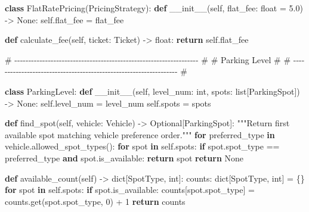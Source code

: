 \documentclass[11pt]{article}
\newenvironment{Shaded}{\begin{snugshade}}{\end{snugshade}}
\newcommand{\BuiltInTok}[1]{\textcolor[rgb]{0.50,0.55,0.55}{#1}}
\newcommand{\CommentTok}[1]{\textcolor[rgb]{0.48,0.49,0.49}{#1}}
\newcommand{\ControlFlowTok}[1]{\textcolor[rgb]{0.99,0.74,0.29}{\textbf{#1}}}
\newcommand{\DecValTok}[1]{\textcolor[rgb]{0.96,0.45,0.00}{#1}}
\newcommand{\FloatTok}[1]{\textcolor[rgb]{0.96,0.45,0.00}{#1}}
\newcommand{\FunctionTok}[1]{\textcolor[rgb]{0.56,0.27,0.68}{#1}}
\newcommand{\KeywordTok}[1]{\textcolor[rgb]{0.81,0.81,0.76}{\textbf{#1}}}
\newcommand{\NormalTok}[1]{\textcolor[rgb]{0.81,0.81,0.76}{#1}}
\newcommand{\OperatorTok}[1]{\textcolor[rgb]{0.81,0.81,0.76}{#1}}
\newcommand{\VariableTok}[1]{\textcolor[rgb]{0.15,0.68,0.68}{#1}}
\begin{document}
\begin{Shaded}
\begin{Highlighting}[]
\KeywordTok{class}\NormalTok{ FlatRatePricing(PricingStrategy):}
    \KeywordTok{def} \FunctionTok{\_\_init\_\_}\NormalTok{(}\VariableTok{self}\NormalTok{, flat\_fee: }\BuiltInTok{float} \OperatorTok{=} \FloatTok{5.0}\NormalTok{) }\OperatorTok{{-}\textgreater{}} \VariableTok{None}\NormalTok{:}
        \VariableTok{self}\NormalTok{.flat\_fee }\OperatorTok{=}\NormalTok{ flat\_fee}

    \KeywordTok{def}\NormalTok{ calculate\_fee(}\VariableTok{self}\NormalTok{, ticket: Ticket) }\OperatorTok{{-}\textgreater{}} \BuiltInTok{float}\NormalTok{:}
        \ControlFlowTok{return} \VariableTok{self}\NormalTok{.flat\_fee}


\CommentTok{\# {-}{-}{-}{-}{-}{-}{-}{-}{-}{-}{-}{-}{-}{-}{-}{-}{-}{-}{-}{-}{-}{-}{-}{-}{-}{-}{-}{-}{-}{-}{-}{-}{-}{-}{-}{-}{-}{-}{-}{-}{-}{-}{-}{-}{-}{-}{-}{-}{-}{-}{-}{-}{-}{-}{-}{-}{-}{-}{-}{-}{-}{-}{-}{-}{-}{-} \#}
\CommentTok{\# Parking Level                                                       \#}
\CommentTok{\# {-}{-}{-}{-}{-}{-}{-}{-}{-}{-}{-}{-}{-}{-}{-}{-}{-}{-}{-}{-}{-}{-}{-}{-}{-}{-}{-}{-}{-}{-}{-}{-}{-}{-}{-}{-}{-}{-}{-}{-}{-}{-}{-}{-}{-}{-}{-}{-}{-}{-}{-}{-}{-}{-}{-}{-}{-}{-}{-}{-}{-}{-}{-}{-}{-}{-} \#}

\KeywordTok{class}\NormalTok{ ParkingLevel:}
    \KeywordTok{def} \FunctionTok{\_\_init\_\_}\NormalTok{(}\VariableTok{self}\NormalTok{, level\_num: }\BuiltInTok{int}\NormalTok{, spots: }\BuiltInTok{list}\NormalTok{[ParkingSpot]) }\OperatorTok{{-}\textgreater{}} \VariableTok{None}\NormalTok{:}
        \VariableTok{self}\NormalTok{.level\_num }\OperatorTok{=}\NormalTok{ level\_num}
        \VariableTok{self}\NormalTok{.spots }\OperatorTok{=}\NormalTok{ spots}

    \KeywordTok{def}\NormalTok{ find\_spot(}\VariableTok{self}\NormalTok{, vehicle: Vehicle) }\OperatorTok{{-}\textgreater{}}\NormalTok{ Optional[ParkingSpot]:}
        \CommentTok{"""Return first available spot matching vehicle preference order."""}
        \ControlFlowTok{for}\NormalTok{ preferred\_type }\KeywordTok{in}\NormalTok{ vehicle.allowed\_spot\_types():}
            \ControlFlowTok{for}\NormalTok{ spot }\KeywordTok{in} \VariableTok{self}\NormalTok{.spots:}
                \ControlFlowTok{if}\NormalTok{ spot.spot\_type }\OperatorTok{==}\NormalTok{ preferred\_type }\KeywordTok{and}\NormalTok{ spot.is\_available:}
                    \ControlFlowTok{return}\NormalTok{ spot}
        \ControlFlowTok{return} \VariableTok{None}

    \KeywordTok{def}\NormalTok{ available\_count(}\VariableTok{self}\NormalTok{) }\OperatorTok{{-}\textgreater{}} \BuiltInTok{dict}\NormalTok{[SpotType, }\BuiltInTok{int}\NormalTok{]:}
\NormalTok{        counts: }\BuiltInTok{dict}\NormalTok{[SpotType, }\BuiltInTok{int}\NormalTok{] }\OperatorTok{=}\NormalTok{ \{\}}
        \ControlFlowTok{for}\NormalTok{ spot }\KeywordTok{in} \VariableTok{self}\NormalTok{.spots:}
            \ControlFlowTok{if}\NormalTok{ spot.is\_available:}
\NormalTok{                counts[spot.spot\_type] }\OperatorTok{=}\NormalTok{ counts.get(spot.spot\_type, }\DecValTok{0}\NormalTok{) }\OperatorTok{+} \DecValTok{1}
        \ControlFlowTok{return}\NormalTok{ counts}



\end{Highlighting}
\end{Shaded}
\end{document}
